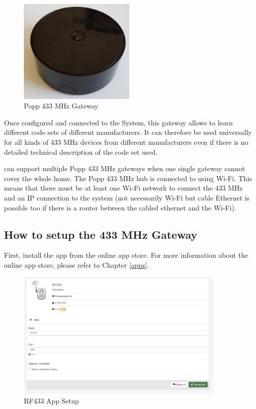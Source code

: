 \begin{figure}
\begin{center}
\includegraphics[width=0.5\textwidth]{pngs/cap9/433gateway.png}
\caption{Popp 433 MHz Gateway}
\label{gwhardware}
\end{center}
\end{figure}

Once configured and connected to the \zway System, this gateway allows to learn different 
code sets of different manufacturers. It can therefore be used universally for all kinds 
of 433 MHz devices from different manufacturers even if there is no detailed technical 
description of the code set used.

\zway can support multiple Popp 433 MHz gateways when one single gateway cannot cover 
the whole home. The Popp 433 MHz hub is connected to \zway using Wi-Fi. This means that 
there must be at least one Wi-Fi network to connect the 433 MHz and an IP connection to 
the \zway system (not necessarily Wi-Fi but cable Ethernet is possible too if there is 
a router between the cabled ethernet and the Wi-Fi).

\subsection {How to setup the 433 MHz Gateway}

First, install the app  from the online app store. For more information about the 
online app store, please refer to Chapter \ref{apps}.

\begin{figure}
\begin{center}
\includegraphics[width=0.9\textwidth]{pngs/cap9/433_1.png}
\caption{RF433 App Setup}
\label{433_1}
\end{center}
\end{figure}


